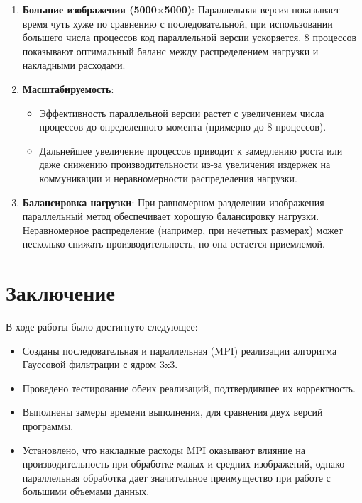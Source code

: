 \documentclass[12pt]{article}
\begin{document}
\begin{enumerate}
    
    \item \textbf{Большие изображения (5000$\times$5000)}: Параллельная версия показывает время чуть хуже по сравнению с последовательной, при использовании большего числа процессов код параллельной версии ускоряется. 8 процессов показывают оптимальный баланс между распределением нагрузки и накладными расходами.
    
    \item \textbf{Масштабируемость}:
    \begin{itemize}
        \item Эффективность параллельной версии растет с увеличением числа процессов до определенного момента (примерно до 8 процессов).
        \item Дальнейшее увеличение процессов приводит к замедлению роста или даже снижению производительности из-за увеличения издержек на коммуникации и неравномерности распределения нагрузки.
    \end{itemize}
    
    \item \textbf{Балансировка нагрузки}: При равномерном разделении изображения параллельный метод обеспечивает хорошую балансировку нагрузки. Неравномерное распределение (например, при нечетных размерах) может несколько снижать производительность, но она остается приемлемой.
\end{enumerate}


\section{Заключение}

В ходе работы было достигнуто следующее:
\begin{itemize}
    \item Созданы последовательная и параллельная (MPI) реализации алгоритма Гауссовой фильтрации с ядром 3x3.
    \item Проведено тестирование обеих реализаций, подтвердившее их корректность.
    \item Выполнены замеры времени выполнения, для сравнения двух версий программы.
    \item Установлено, что накладные расходы MPI оказывают влияние на производительность при обработке малых и средних изображений, однако параллельная обработка дает значительное преимущество при работе с большими объемами данных.
\end{itemize}
\end{document}
